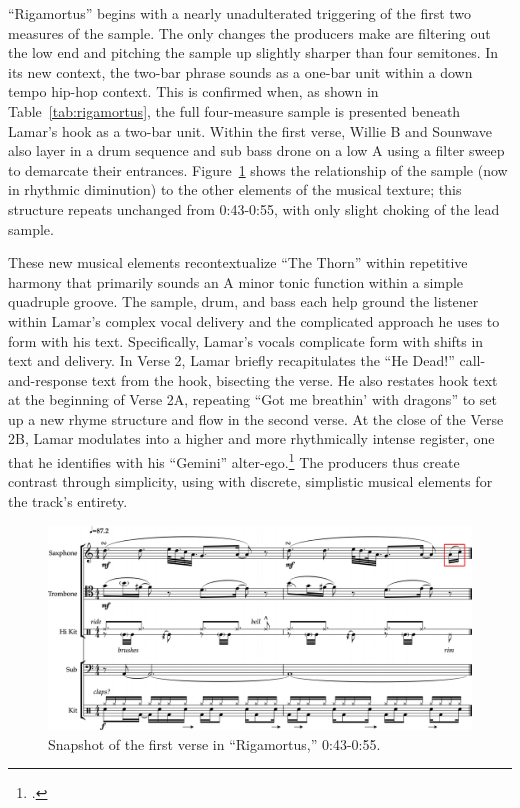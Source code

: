 ``Rigamortus'' begins with a nearly unadulterated triggering of the first two measures of the sample. The only changes the producers make are filtering out the low end and pitching the sample up slightly sharper than four semitones. In its new context, the two-bar phrase sounds as a one-bar unit within a down tempo hip-hop context. This is confirmed when, as shown in Table~\ref{tab:rigamortus}, the full four-measure sample is presented beneath Lamar's hook as a two-bar unit. Within the first verse, Willie B and Sounwave also layer in a drum sequence and sub bass drone on a low A using a filter sweep to demarcate their entrances. Figure~\ref{fig:rigamortusnoslip} shows the relationship of the sample (now in rhythmic diminution) to the other elements of the musical texture; this structure repeats unchanged from 0:43-0:55, with only slight choking of the lead sample.

These new musical elements recontextualize ``The Thorn'' within repetitive harmony that primarily sounds an A minor tonic function within a simple quadruple groove. The sample, drum, and bass each help ground the listener within Lamar's complex vocal delivery and the complicated approach he uses to form with his text. Specifically, Lamar's vocals complicate form with shifts in text and delivery. In Verse 2, Lamar briefly recapitulates the ``He Dead!'' call-and-response text from the hook, bisecting the verse. He also restates hook text at the beginning of Verse 2A, repeating ``Got me breathin' with dragons'' to set up a new rhyme structure and flow in the second verse. At the close of the Verse 2B, Lamar modulates into a higher and more rhythmically intense register, one that he identifies with his ``Gemini'' alter-ego.\footnote{\cite{chrismenchTrackingManyVoices2017}.} The producers thus create contrast through simplicity, using with discrete, simplistic musical elements for the track's entirety.

\begin{figure}[ht]
    \centering
    \includegraphics[width=\textwidth]{images/figures/chp 02/043053rigamortusnoslip.pdf}
    \caption{Snapshot of the first verse in ``Rigamortus,'' 0:43-0:55.}
    \label{fig:rigamortusnoslip}
\end{figure}


